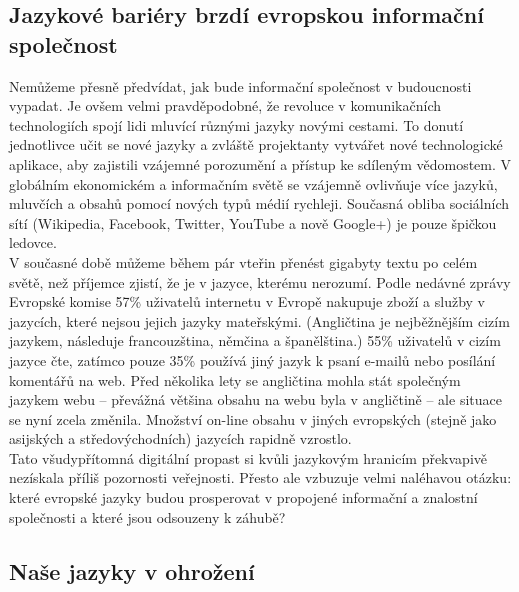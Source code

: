 \documentclass[]{../../metanetpaper}
\begin{document}
\begin{multicols}{2}
\subsection{Jazykové bariéry brzdí evropskou informační společnost}

Nemůžeme přesně předvídat, jak bude informační společnost v budoucnosti vypadat. Je ovšem velmi pravděpodobné, že revoluce v komunikačních technologiích spojí lidi mluvící různými jazyky novými cestami. To donutí jednotlivce učit se nové jazyky a zvláště projektanty vytvářet nové technologické aplikace, aby zajistili vzájemné porozumění a přístup ke sdíleným vědomostem. V globálním ekonomickém a informačním světě se vzájemně ovlivňuje více jazyků, mluvčích a obsahů pomocí nových typů médií rychleji. Současná obliba sociálních sítí (Wikipedia, Facebook, Twitter, YouTube a nově Google+) je pouze špičkou ledovce.\\
V současné době můžeme během pár vteřin přenést gigabyty textu po celém světě, než příjemce zjistí, že je v jazyce, kterému nerozumí. Podle nedávné zprávy Evropské komise 57\% uživatelů internetu v Evropě nakupuje zboží a služby v jazycích, které nejsou jejich jazyky mateřskými. (Angličtina je nejběžnějším cizím jazykem, následuje francouzština, němčina a španělština.) 55\% uživatelů v cizím jazyce čte, zatímco pouze 35\% používá jiný jazyk k psaní e-mailů nebo posílání komentářů na web.\cite{EC1} Před několika lety se angličtina mohla stát společným jazykem webu – převážná většina obsahu na webu byla v angličtině – ale situace se nyní zcela změnila. Množství on-line obsahu v jiných evropských (stejně jako asijských a středovýchodních) jazycích rapidně vzrostlo.\\
Tato všudypřítomná digitální propast si kvůli jazykovým hranicím překvapivě nezískala příliš pozornosti veřejnosti. Přesto ale vzbuzuje velmi naléhavou otázku: které evropské jazyky budou prosperovat v propojené informační a znalostní společnosti a které jsou odsouzeny k záhubě?

\subsection{Naše jazyky v ohrožení}


\end{multicols}
\end{document}
